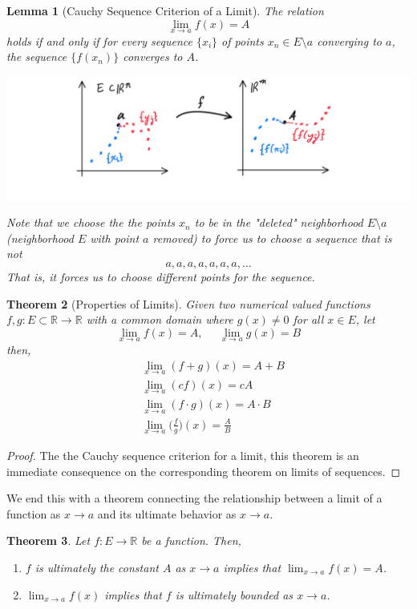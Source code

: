 \documentclass{article}
\newtheorem{theorem}{Theorem}[section]
\newtheorem{lemma}[theorem]{Lemma}
\theoremstyle{remark}
\theoremstyle{definition}
\begin{document}
\begin{lemma}[Cauchy Sequence Criterion of a Limit]
The relation 
\[\lim_{x \rightarrow a} f(x) = A\]
holds if and only if for every sequence $\{x_i\}$ of points $x_n \in E \setminus a$ converging to $a$, the sequence $\{f(x_n)\}$ converges to $A$. 
\begin{center}
    \includegraphics[scale=0.3]{img/Cauchy_Criterion_of_Limit_of_Function.PNG}
\end{center}
Note that we choose the the points $x_n$ to be in the "deleted" neighborhood $E\setminus a$ (neighborhood $E$ with point $a$ removed) to force us to choose a sequence that is not
\[a, a, a, a, a, a, a, \ldots\]
That is, it forces us to choose different points for the sequence. 
\end{lemma}

\begin{theorem}[Properties of Limits]
Given two numerical valued functions $f, g: E \subset \mathbb{R} \longrightarrow \mathbb{R}$ with a common domain where $g(x) \neq 0$ for all $x \in E$, let 
\[\lim_{x \rightarrow a} f(x) = A, \;\;\;\;\; \lim_{x \rightarrow a} g(x) = B\]
then, 
\begin{align*}
    & \lim_{x \rightarrow a} (f+g)(x) = A + B \\
    & \lim_{x \rightarrow a} (cf)(x) = cA \\
    & \lim_{x \rightarrow a} (f \cdot g)(x) = A \cdot B \\
    & \lim_{x \rightarrow a} \bigg(\frac{f}{g}\bigg) (x) = \frac{A}{B}
\end{align*}
\end{theorem}
\begin{proof}
The the Cauchy sequence criterion for a limit, this theorem is an immediate consequence on the corresponding theorem on limits of sequences.
\end{proof}

We end this with a theorem connecting the relationship between a limit of a function as $x \rightarrow a$ and its ultimate behavior as $x \rightarrow a$. 

\begin{theorem}
Let $f: E \longrightarrow \mathbb{R}$ be a function. Then, 
\begin{enumerate}
    \item $f$ is ultimately the constant $A$ as $x \rightarrow a$ implies that $\lim_{x \rightarrow a} f(x) = A$. 
    \item $\lim_{x \rightarrow a} f(x)$ implies that $f$ is ultimately bounded as $x \rightarrow a$. 
\end{enumerate}
\end{theorem}
\end{document}
